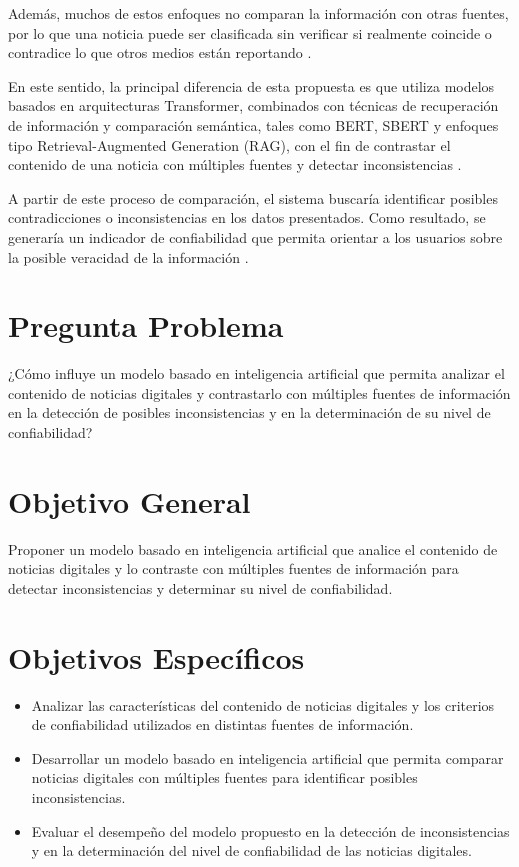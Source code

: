 \documentclass[12pt]{article}
\begin{document}
Además, muchos de estos enfoques no comparan la información con otras fuentes, por lo que una noticia puede ser clasificada sin verificar si realmente coincide o contradice lo que otros medios están reportando \cite{popat2018declare}.  

En este sentido, la principal diferencia de esta propuesta es que utiliza modelos basados en arquitecturas Transformer, combinados con técnicas de recuperación de información y comparación semántica, tales como BERT, SBERT y enfoques tipo Retrieval-Augmented Generation (RAG), con el fin de contrastar el contenido de una noticia con múltiples fuentes y detectar inconsistencias \cite{ghadiri2022automated}. 

A partir de este proceso de comparación, el sistema buscaría identificar posibles contradicciones o inconsistencias en los datos presentados. Como resultado, se generaría un indicador de confiabilidad que permita orientar a los usuarios sobre la posible veracidad de la información \cite{dey2024retrieval}. 

\section{Pregunta Problema}

¿Cómo influye un modelo basado en inteligencia artificial que permita analizar el contenido de noticias digitales y contrastarlo con múltiples fuentes de información en la detección de posibles inconsistencias y en la determinación de su nivel de confiabilidad?

\section{Objetivo General}

Proponer un modelo basado en inteligencia artificial que analice el contenido de noticias digitales y lo contraste con múltiples fuentes de información para detectar inconsistencias y determinar su nivel de confiabilidad.

\section{Objetivos Específicos}

\begin{itemize}
    \item Analizar las características del contenido de noticias digitales y los criterios de confiabilidad utilizados en distintas fuentes de información.
    
    \item Desarrollar un modelo basado en inteligencia artificial que permita comparar noticias digitales con múltiples fuentes para identificar posibles inconsistencias.
    
    \item Evaluar el desempeño del modelo propuesto en la detección de inconsistencias y en la determinación del nivel de confiabilidad de las noticias digitales.
\end{itemize}
\end{document}
